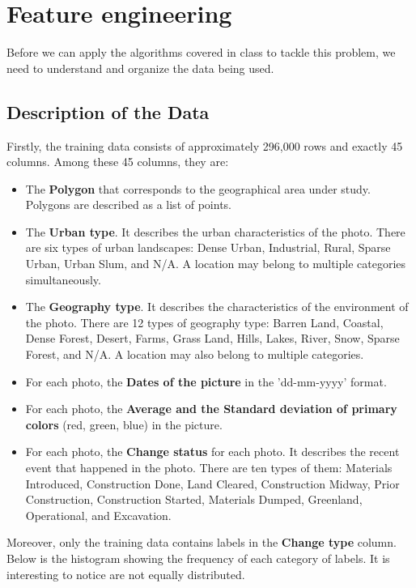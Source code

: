 \section{Feature engineering}

Before we can apply the algorithms covered in class to tackle this problem, we need to understand and organize the data being used.

\subsection{Description of the Data}

Firstly, the training data consists of approximately 296,000 rows and exactly 45 columns. Among these 45 columns, they are:

\begin{itemize}
    \item The \textbf{Polygon} that corresponds to the geographical area under study. Polygons are described as a list of points.
    \item The \textbf{Urban type}. It describes the urban characteristics of the photo. There are six types of urban landscapes: Dense Urban, Industrial, Rural, Sparse Urban, Urban Slum, and N/A. A location may belong to multiple categories simultaneously.
    \item The \textbf{Geography type}. It describes the characteristics of the environment of the photo. There are 12 types of geography type: Barren Land, Coastal, Dense Forest, Desert, Farms, Grass Land, Hills, Lakes, River, Snow, Sparse Forest, and N/A. A location may also belong to multiple categories.
    \item For each photo, the \textbf{Dates of the picture} in the 'dd-mm-yyyy' format.
    \item For each photo, the \textbf{Average and the Standard deviation of primary colors} (red, green, blue) in the picture.
    \item For each photo, the \textbf{Change status} for each photo. It describes the recent event that happened in the photo. There are ten types of them: Materials Introduced, Construction Done, Land Cleared, Construction Midway, Prior Construction, Construction Started, Materials Dumped, Greenland, Operational, and Excavation.
\end{itemize}

Moreover, only the training data contains labels in the \textbf{Change type} column. Below is the histogram showing the frequency of each category of labels. It is interesting to notice are not equally distributed.

